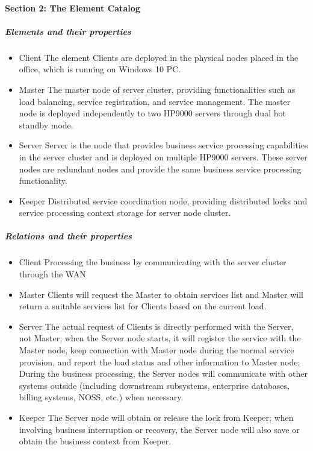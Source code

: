 \documentclass{article}
\begin{document}
			\paragraph{Section 2: The Element Catalog}
			\subparagraph{Elements and their properties}
			\begin{itemize}
			\item{Client} The element Clients are deployed in the physical nodes placed in the office, which is running on Windows 10 PC.
			\item{Master} The master node of server cluster, providing functionalities such as load balancing, service registration, and service management. The master node is deployed independently to two HP9000 servers through dual hot standby mode.
			\item{Server} Server is the node that provides business service processing capabilities in the server cluster and is deployed on multiple HP9000 servers. These server nodes are redundant nodes and provide the same business service processing functionality.
			\item{Keeper} Distributed service coordination node, providing distributed locks and service processing context storage for server node cluster.
			\end{itemize}
			\subparagraph{Relations and their properties}
			\begin{itemize}
			\item{Client} Processing the business by communicating with the server cluster through the WAN
			\item{Master} Clients will request the Master to obtain services list and Master will return a suitable services list for Clients based on the current load.
			\item{Server} The actual request of Clients is directly performed with the Server, not Master; when the Server node starts, it will register the service with the Master node, keep connection with Master node during the normal service provision, and report the load status and other information to Master node; During the business processing, the Server nodes will communicate with other systems outside (including downstream subsystems, enterprise databases, billing systems, NOSS, etc.) when necessary.
			\item{Keeper} The Server node will obtain or release the lock from Keeper; when involving business interruption or recovery, the Server node will also save or obtain the business context from Keeper.
			\end{itemize}
\end{document}
